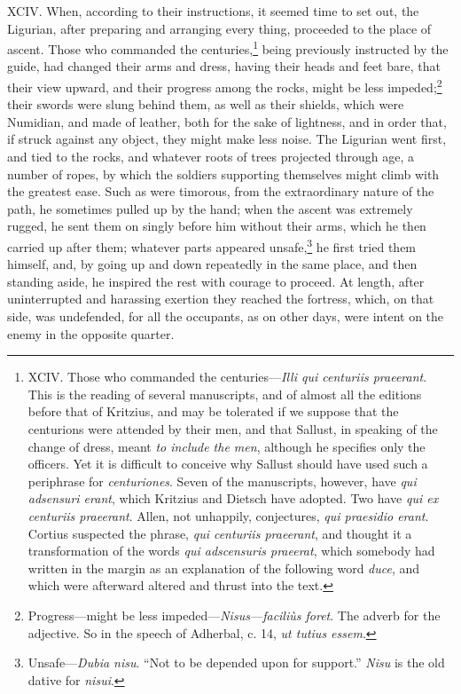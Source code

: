 XCIV. When, according to their instructions, it seemed time to set
out, the Ligurian, after preparing and arranging every thing,
proceeded to the place of ascent. Those who commanded the
centuries,\footnote{XCIV. Those who commanded the centuries—\emph{Illi qui centuriis
praeerant}. This is the reading of several manuscripts, and of almost
all the editions before that of Kritzius, and may be tolerated if we
suppose that the centurions were attended by their men, and that
Sallust, in speaking of the change of dress, meant \emph{to include the
men}, although he specifies only the officers. Yet it is difficult
to conceive why Sallust should have used such a periphrase for
\emph{centuriones}. Seven of the manuscripts, however, have \emph{qui adsensuri
erant}, which Kritzius and Dietsch have adopted. Two have \emph{qui ex
centuriis praeerant}. Allen, not unhappily, conjectures, \emph{qui
praesidio erant}. Cortius suspected the phrase, \emph{qui centuriis
praeerant}, and thought it a transformation of the words \emph{qui
adscensuris praeerat}, which somebody had written in the margin as an
explanation of the following word \emph{duce}, and which were afterward
altered and thrust into the text.} being previously instructed by the guide, had changed
their arms and dress, having their heads and feet bare, that their
view upward, and their progress among the rocks, might be less
impeded;\footnote{Progress—might be less impeded—\emph{Nisus—faciliùs foret}. The
adverb for the adjective. So in the speech of Adherbal, c. 14, \emph{ut
tutius essem}.} their swords were slung behind them, as well as their
shields, which were Numidian, and made of leather, both for the sake
of lightness, and in order that, if struck against any object, they
might make less noise. The Ligurian went first, and tied to the rocks,
and whatever roots of trees projected through age, a number of ropes,
by which the soldiers supporting themselves might climb with the
greatest ease. Such as were timorous, from the extraordinary nature of
the path, he sometimes pulled up by the hand; when the ascent was
extremely rugged, he sent them on singly before him without their
arms, which he then carried up after them; whatever parts appeared
unsafe,\footnote{Unsafe—\emph{Dubia nisu}. ``Not to be depended upon for support.''
\emph{Nisu} is the old dative for \emph{nisui}.} he first tried them himself, and, by going up and down
repeatedly in the same place, and then standing aside, he inspired the
rest with courage to proceed. At length, after uninterrupted and
harassing exertion they reached the fortress, which, on that side, was
undefended, for all the occupants, as on other days, were intent on
the enemy in the opposite quarter.

